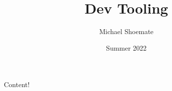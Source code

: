 \documentclass[11pt,a4paper]{article}
\title{Dev Tooling}
\author{Michael Shoemate}
\date{Summer 2022}
\begin{document}
Content!
\end{document}
